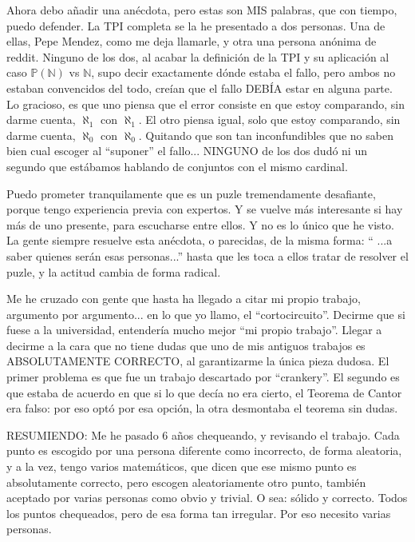\noindent
Ahora debo añadir una anécdota, pero estas son MIS palabras, que con tiempo, puedo defender. La TPI completa se la he presentado a dos personas. Una de ellas, Pepe Mendez, como me deja llamarle, y otra una persona anónima de reddit. Ninguno de los dos, al acabar la definición de la TPI y su aplicación al caso $\mathbb{P(N)}$ vs $\mathbb{N}$, supo decir exactamente dónde estaba el fallo, pero ambos no estaban convencidos del todo, creían que el fallo DEBÍA estar en alguna parte. Lo gracioso, es que uno piensa que el error consiste en que estoy comparando, sin darme cuenta, $\aleph_{1}$ con $\aleph_{1}$. El otro piensa igual, solo que estoy comparando, sin darme cuenta, $\aleph_{0}$ con $\aleph_{0}$. Quitando que son tan inconfundibles que no saben bien cual escoger al ``suponer'' el fallo... NINGUNO de los dos dudó ni un segundo que estábamos hablando de conjuntos con el mismo cardinal.

\noindent
Puedo prometer tranquilamente que es un puzle tremendamente desafiante, porque tengo experiencia previa con expertos. Y se vuelve más interesante si hay más de uno presente, para escucharse entre ellos. Y no es lo único que he visto. La gente siempre resuelve esta anécdota, o parecidas, de la misma forma: `` ...a saber quienes serán esas personas...'' hasta que les toca a ellos tratar de resolver el puzle, y la actitud cambia de forma radical.

\noindent
Me he cruzado con gente que hasta ha llegado a citar mi propio trabajo, argumento por argumento... en lo que yo llamo, el ``cortocircuito''. Decirme que si fuese a la universidad, entendería mucho mejor ``mi propio trabajo''. Llegar a decirme a la cara que no tiene dudas que uno de mis antiguos trabajos es ABSOLUTAMENTE CORRECTO, al garantizarme la única pieza dudosa. El primer problema es que fue un trabajo descartado por ``crankery''. El segundo es que estaba de acuerdo en que si lo que decía no era cierto, el Teorema de Cantor era falso: por eso optó por esa opción, la otra desmontaba el teorema sin dudas.

\noindent
RESUMIENDO: Me he pasado 6 años chequeando, y revisando el trabajo. Cada punto es escogido por una persona diferente como incorrecto, de forma aleatoria, y a la vez, tengo varios matemáticos, que dicen que ese mismo punto es absolutamente correcto, pero escogen aleatoriamente otro punto, también aceptado por varias personas como obvio y trivial. O sea: sólido y correcto. Todos los puntos chequeados, pero de esa forma tan irregular. Por eso necesito varias personas.

